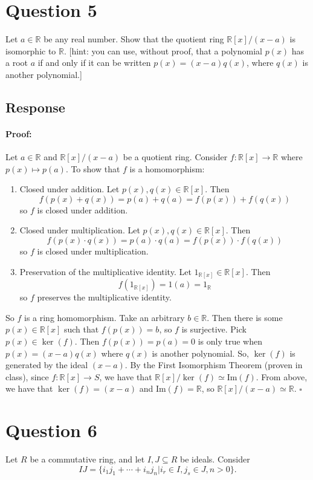 \documentclass [12pt] {article}
\newcommand{\R}{\mathbb{R}}
\newenvironment{proof}{\paragraph{Proof:}}{\hfill$\square$}
\renewcommand{\Im}{\text{Im}}
\begin{document}
\section*{Question 5}
Let $a\in\R$ be any real number. Show that the quotient ring $\R[x]/(x-a)$ is isomorphic to $\R$. [hint: you can use, without proof, that a polynomial $p(x)$ has a root $a$ if and only if it can be written $p(x)=(x-a)q(x)$, where $q(x)$ is another polynomial.] 
\subsection*{Response}
\begin{proof}
    Let $a \in \R$ and $\R[x]/(x - a)$ be a quotient ring. Consider $f : \R[x] \to \R$ where
    $p(x) \mapsto p(a)$. To show that $f$ is a homomorphism:
    \begin{enumerate}
        \item Closed under addition. Let $p(x), q(x) \in \R[x]$. Then
            \[f(p(x) + q(x)) = p(a) + q(a) = f(p(x)) + f(q(x))\]
            so $f$ is closed under addition.
        \item Closed under multiplication. Let $p(x), q(x) \in \R[x]$. Then
            \[f(p(x) \cdot q(x)) = p(a) \cdot q(a) = f(p(x)) \cdot f(q(x))\]
            so $f$ is closed under multiplication.
        \item Preservation of the multiplicative identity. Let $1_{\R[x]} \in \R[x]$. Then
            \[f(1_{\R[x]}) = 1(a) = 1_{\R}\]
            so $f$ preserves the multiplicative identity.
    \end{enumerate}
    So $f$ is a ring homomorphism. Take an arbitrary $b \in \R$. Then there is some $p(x) \in \R[x]$ 
    such that $f(p(x)) = b$, so $f$ is surjective. Pick $p(x) \in \ker(f)$. Then $f(p(x)) = p(a) = 0$ 
    is only true when $p(x) = (x - a)q(x)$ where $q(x)$ is another polynomial. So, $\ker(f)$ is 
    generated by the ideal $(x - a)$. By the First Isomorphism Theorem (proven in class),
    since $f : \R[x] \to S$, we have that $\R[x]/\ker(f) \simeq \Im(f)$. From above, we have that
    $\ker(f) = (x - a)$ and $\Im(f) = \R$, so $\R[x]/(x - a) \simeq \R$.
\end{proof}
\newpage

\section*{Question 6}
Let $R$ be a commutative ring, and let $I,J\subseteq R$ be ideals. Consider $$IJ=\{i_1j_1+\cdots + i_nj_n|i_r\in I, j_s\in J, n>0\}.$$
\end{document}
